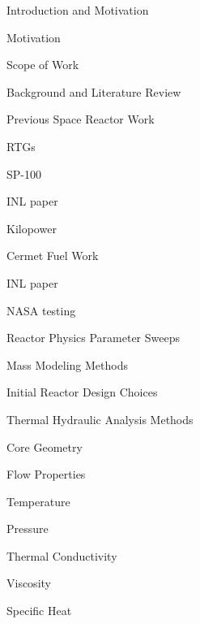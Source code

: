 \documentclass{report}
\begin{document}
\begin{outline}
  \item { Introduction and Motivation }
  \begin{outline}
    \item { Motivation } \\
    \item { Scope of Work } \\
  \end{outline}
  \item { Background and Literature Review }
      \begin{outline}
          \item { Previous Space Reactor Work }
                \begin{outline}
                \item {RTGs}
                \item {SP-100}
                \item {INL paper}
                \item {Kilopower}
                \end{outline}
           \item { Cermet Fuel Work }
                \begin{outline}
                \item {INL paper}
                \item {NASA testing}
                \end{outline}
      \end{outline}
  \item { Reactor Physics Parameter Sweeps }
  \item { Mass Modeling Methods }
      \begin{outline}
      \item { Initial Reactor Design Choices }
      \item { Thermal Hydraulic Analysis Methods }
          \begin{outline}
          \item { Core Geometry }
          \item { Flow Properties }
              \begin{outline}
              \item { Temperature }
              \item { Pressure }
              \item { Thermal Conductivity }
              \item { Viscosity }
              \item { Specific Heat }

\end{outline}
\end{outline}
\end{outline}
\end{outline}
\end{document}
